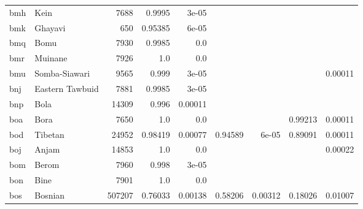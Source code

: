 \documentclass[11pt]{article}
\begin{document}
\begin{table*}[ht]
{\begin{tabular}{llrrrrrrr}
bmh         & Kein         & 7688         & 0.9995         & 3e-05         &          &          &          &          \\

bmk         & Ghayavi         & 650         & 0.95385         & 6e-05         &          &          &          &          \\

bmq         & Bomu         & 7930         & 0.9985         & 0.0         &          &          &          &          \\

bmr         & Muinane         & 7926         & 1.0         & 0.0         &          &          &          &          \\

bmu         & Somba-Siawari         & 9565         & 0.999         & 3e-05         &          &          &          & 0.00011         \\

bnj         & Eastern Tawbuid         & 7881         & 0.9985         & 3e-05         &          &          &          &          \\

bnp         & Bola         & 14309         & 0.996         & 0.00011         &          &          &          &          \\

boa         & Bora         & 7650         & 1.0         & 0.0         &          &          & 0.99213         & 0.00011         \\

bod         & Tibetan         & 24952         & 0.98419         & 0.00077         & 0.94589         & 6e-05         & 0.89091         & 0.00011         \\

boj         & Anjam         & 14853         & 1.0         & 0.0         &          &          &          & 0.00022         \\

bom         & Berom         & 7960         & 0.998         & 3e-05         &          &          &          &          \\

bon         & Bine         & 7901         & 1.0         & 0.0         &          &          &          &          \\

bos         & Bosnian         & 507207         & 0.76033         & 0.00138         & 0.58206         & 0.00312         & 0.18026         & 0.01007         \\


\end{tabular}}
\end{table*}
\end{document}
